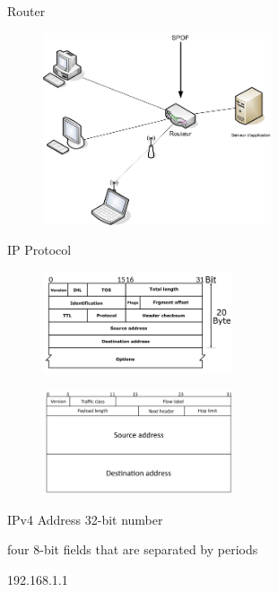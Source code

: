 \documentclass[UTF8]{ctexbeamer}
\begin{document}
\begin{frame}{Router}
    \begin{figure}
        \centering
        \includegraphics[width=0.6\textwidth]{SPOF.png}
    \end{figure}
\end{frame}

\begin{frame}{IP Protocol}
    \begin{figure}
        \centering
        \includegraphics[width=0.5\textwidth]{IPv4_Header.png}
    \end{figure}
    \begin{figure}
        \centering
        \includegraphics[width=0.5\textwidth]{IPv6_Header.png}
    \end{figure}
\end{frame}

\begin{frame}{IPv4 Address}
    32-bit number
    
    four 8-bit fields that are separated by periods
    
    192.168.1.1
\end{frame}
\end{document}
